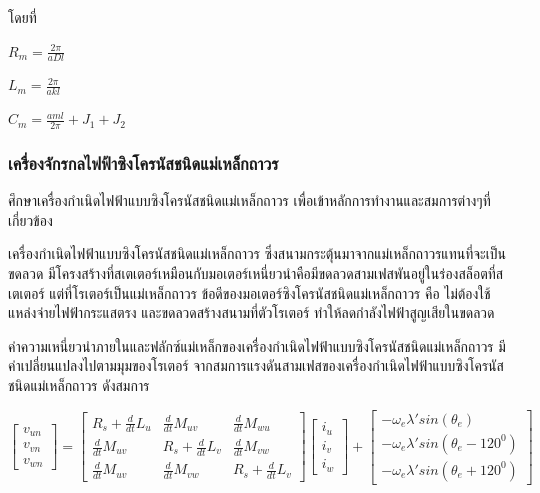 \documentclass[11pt,a4paper]{article}
\begin{document}
โดยที่

$R_{m} = \frac{2\pi}{aDl}$

$L_{m} = \frac{2\pi}{akl}$

$C_{m} = \frac{aml}{2\pi} + J_{1} + J_{2}$


\subsubsection{เครื่องจักรกลไฟฟ้าซิงโครนัสชนิดแม่เหล็กถาวร}
ศึกษาเครื่องกำเนิดไฟฟ้าแบบซิงโครนัสชนิดแม่เหล็กถาวร \cite{sswch4} \cite{PMSM} เพื่อเข้าหลักการทำงานและสมการต่างๆที่เกี่ยวข้อง

เครื่องกำเนิดไฟฟ้าแบบซิงโครนัสชนิดแม่เหล็กถาวร ซึ่งสนามกระตุ้นมาจากแม่เหล็กถาวรแทนที่จะเป็นขดลวด มีโครงสร้างที่สเตเตอร์เหมือนกับมอเตอร์เหนี่ยวนำคือมีขดลวดสามเฟสพันอยู่ในร่องสล็อตที่สเตเตอร์ แต่ที่โรเตอร์เป็นแม่เหล็กถาวร ข้อดีของมอเตอร์ซิงโครนัสชนิดแม่เหล็กถาวร คือ ไม่ต้องใช้แหล่งจ่ายไฟฟ้ากระแสตรง และขดลวดสร้างสนามที่ตัวโรเตอร์ ทำให้ลดกำลังไฟฟ้าสูญเสียในขดลวด

ค่าความเหนี่ยวนำภายในและฟลักซ์แม่เหล็กของเครื่องกำเนิดไฟฟ้าแบบซิงโครนัสชนิดแม่เหล็กถาวร มีค่าเปลี่ยนแปลงไปตามมุมของโรเตอร์ จากสมการแรงดันสามเฟสของเครื่องกำเนิดไฟฟ้าแบบซิงโครนัสชนิดแม่เหล็กถาวร ดังสมการ

\begin{equation}
    \begin{bmatrix}
        v_{un} \\v_{vn} \\v_{wn}
    \end{bmatrix}=
    \begin{bmatrix}
        R_{s}+\frac{d}{dt}L_{u} & \frac{d}{dt}M_{uv}      & \frac{d}{dt}M_{wu}      \\
        \frac{d}{dt}M_{uv}      & R_{s}+\frac{d}{dt}L_{v} & \frac{d}{dt}M_{vw}      \\
        \frac{d}{dt}M_{uv}      & \frac{d}{dt}M_{vw}      & R_{s}+\frac{d}{dt}L_{v}
    \end{bmatrix}
    \begin{bmatrix}
        i_{u} \\i_{v} \\i_{w}
    \end{bmatrix}+
    \begin{bmatrix}
        -\omega_{e} \lambda' sin(\theta_{e}) \\-\omega_{e} \lambda' sin(\theta_{e} - 120^0) \\-\omega_{e} \lambda' sin(\theta_{e}+120^0)
    \end{bmatrix}
\end{equation}
\end{document}
